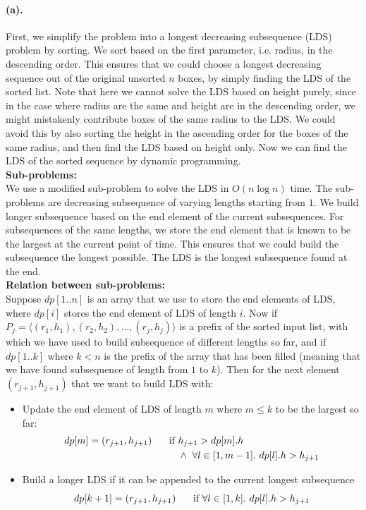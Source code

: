 \documentclass[12pt]{article}
\begin{document}
\paragraph{(a).}
First, we simplify the problem into a longest decreasing subsequence (LDS) problem by sorting. We sort based on the first parameter, i.e. radius, in the descending order. This ensures that we could choose a longest decreasing sequence out of the original unsorted \(n\) boxes, by simply finding the LDS of the sorted list. Note that here we cannot solve the LDS based on height purely, since in the case where radius are the same and height are in the descending order, we might mistakenly contribute boxes of the same radius to the LDS. We could avoid this by also sorting the height in the ascending order for the boxes of the same radius, and then find the LDS based on height only.
Now we can find the LDS of the sorted sequence by dynamic programming. \\
\textbf{Sub-problems:}\\
We use a modified sub-problem to solve the LDS in \(O(n\log n)\) time. The sub-problems are decreasing subsequence of varying lengths starting from \(1\). We build longer subsequence based on the end element of the current subsequences. For subsequences of the same lengths, we store the end element that is known to be the largest at the current point of time. This ensures that we could build the subsequence the longest possible. The LDS is the longest subsequence found at the end.\\
\textbf{Relation between sub-problems:} \\
Suppose \(dp[1..n]\) is an array that we use to store the end elements of LDS, where \(dp[i]\) stores the end element of LDS of length \(i\). Now if \(P_j = \langle(r_1,h_1), (r_2, h_2), \hdots, (r_j, h_j)\rangle\) is a prefix of the sorted input list, with which we have used to build subsequence of different lengths so far, and if \(dp[1..k]\) where \(k < n\) is the prefix of the array that has been filled (meaning that we have found subsequence of length from \(1\) to \(k\)). Then for the next element \((r_{j+1}, h_{j+1})\) that we want to build LDS with:
\begin{itemize}
     \setlength \itemsep{0em} 
     \item Update the end element of LDS of length \(m\) where \(m \leq k\) to be the largest so far:
     \begin{align*}
          dp[m] = (r_{j+1}, h_{j+1}) \hspace{0.5cm} 
          \text{ if } &h_{j+1} > dp[m].h\\ 
          &\land\ \forall l\in [1,m-1].\ dp[l].h > h_{j+1}
     \end{align*}
     \item Build a longer LDS if it can be appended to the current longest subsequence
     \begin{equation*}
          dp[k+1] = (r_{j+1}, h_{j+1}) \hspace{0.5cm} \text{ if } \forall l\in[1,k].\ dp[l].h > h_{j+1}
     \end{equation*}
\end{itemize}
 
\end{document}
